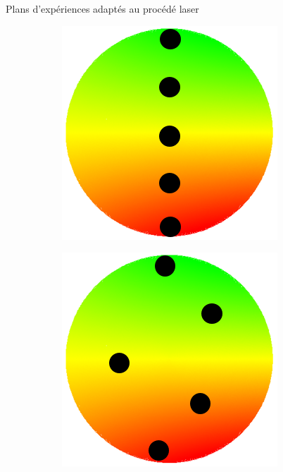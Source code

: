 \documentclass[10pt]{beamer}
\begin{document}
\begin{frame}
\begin{block}{Plans d'expériences adaptés au procédé laser}
\begin{figure}[H]
\begin{subfigure}[l]{0.2\textwidth}
\label{fige}
\end{subfigure}%
\hspace{0.05\textwidth}
\begin{subfigure}[l]{0.2\textwidth}
\centering 
\includegraphics[width=\textwidth, height=\textwidth]{figures/doe5.png}
\label{fige}
\end{subfigure}%
\hspace{0.05\textwidth}
\begin{subfigure}[l]{0.2\textwidth}
\centering 
\includegraphics[width=\textwidth, height=\textwidth]{figures/doe5bis.png}
\label{fige}
\end{subfigure}%
 

\end{figure}
\end{block}
\end{frame}
\end{document}
